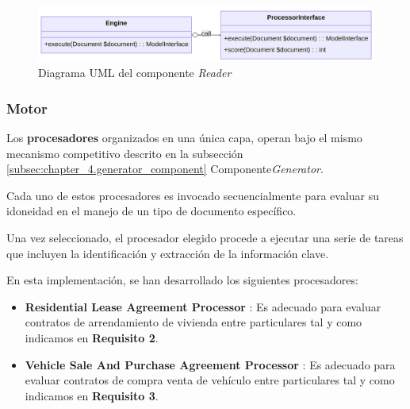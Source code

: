 \begin{figure}[ht]
    \begin{center}
        \includegraphics[width=\textwidth]{./chapter/4/images/chapter_4.1.reader_component_uml}
        \caption{Diagrama UML del componente \textit{Reader}}
        \label{fig:chapter_4.1.reader_component_uml}
    \end{center}
\end{figure}

\subsubsection*{Motor}

Los \textbf{procesadores} organizados en una única capa,  operan bajo el mismo mecanismo competitivo descrito en la
subsección \ref{subsec:chapter_4.generator_component} Componente\textit{Generator}.

Cada uno de estos procesadores es invocado secuencialmente para evaluar su idoneidad en el manejo de un tipo de
documento específico.

Una vez seleccionado, el procesador elegido procede a ejecutar una serie de tareas que incluyen la identificación y
extracción de la información clave.

En esta implementación, se han desarrollado los siguientes procesadores:

\begin{itemize}
    \item \textbf{Residential Lease Agreement Processor}
    : Es adecuado para evaluar contratos de arrendamiento de vivienda entre
    particulares tal y como indicamos en \textbf{Requisito 2}.
    \item \textbf{Vehicle Sale And Purchase Agreement Processor}
    : Es adecuado para evaluar contratos de compra venta de vehículo
    entre particulares tal y como indicamos en \textbf{Requisito 3}.
\end{itemize}
